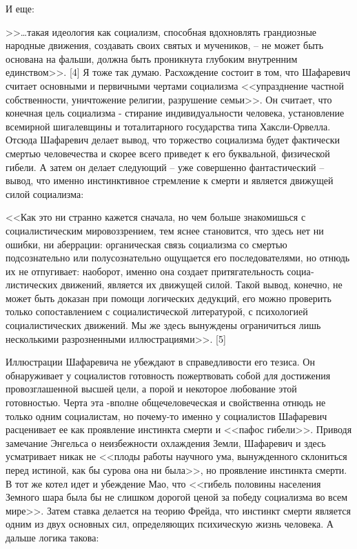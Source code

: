 \documentclass{book}
\begin{document}
И еще:

>>\ldots такая идеология как социализм, способная вдохновлять грандиозные народные движения, создавать своих святых и му­чеников, -- не может быть основана на фальши, должна быть проникнута глубоким внутренним единством>>. [4]
Я тоже так думаю. Расхождение состоит в том, что Шафаревич считает основными и первичными чертами социализма <<упразднение частной собственности, уничтожение религии, раз­рушение семьи>>. Он считает, что конечная цель социализма - стирание индивидуальности человека, установление всемирной шигалевщины и тоталитарного государства типа Хаксли-Орвелла. Отсюда Шафаревич делает вывод, что торжество социализ­ма будет фактически смертью человечества и скорее всего при­ведет к его буквальной, физической гибели. А затем он делает следующий -- уже совершенно фантастический -- вывод, что именно инстинктивное стремление к смерти и является движу­щей силой социализма:

<<Как это ни странно кажется сначала, но чем больше знако­мишься с социалистическим мировоззрением, тем яснее стано­вится, что здесь нет ни ошибки, ни аберрации: органическая связь социализма со смертью подсознательно или полусозна­тельно ощущается его последователями, но отнюдь их не отпу­гивает: наоборот, именно она создает притягательность социа­листических движений, является их движущей силой. Такой вывод, конечно, не может быть доказан при помощи логиче­ских дедукций, его можно проверить только сопоставлением с социалистической литературой, с психологией социалисти­ческих движений. Мы же здесь вынуждены ограничиться лишь несколькими разрозненными иллюстрациями>>. [5]

Иллюстрации Шафаревича не убеждают в справедливости его тезиса. Он обнаруживает у социалистов готовность пожертво­вать собой для достижения провозглашенной высшей цели, а порой и некоторое любование этой готовностью. Черта эта -вполне общечеловеческая и свойственна отнюдь не только од­ним социалистам, но почему-то именно у социалистов Шафаревич расценивает ее как проявление инстинкта смерти и <<пафос гибели>>. Приводя замечание Энгельса о неизбежности охлажде­ния Земли, Шафаревич и здесь усматривает никак не <<плоды работы научного ума, вынужденного склониться перед истиной, как бы сурова она ни была>>, но проявление инстинкта смерти. В тот же котел идет и убеждение Мао, что <<гибель половины на­селения Земного шара была бы не слишком дорогой ценой за победу социализма во всем мире>>. Затем ставка делается на тео­рию Фрейда, что инстинкт смерти является одним из двух основ­ных сил, определяющих психическую жизнь человека. А даль­ше логика такова:
\end{document}
